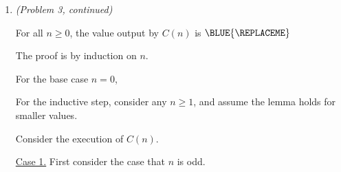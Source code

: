 \begin{enumerate}[label=(\alph*)]
\begin{longFormProof}
    \step By Block~\ref{block: mysterious additions}, for any $n\ge 2$, if the lemma holds for smaller values,
    then it holds for $n$.

    \step By induction (with Step~\ref{step: base additions}), the lemma holds for all $n$.
    
  \end{longFormProof}



  \continued 

\item \emph{(Problem 3, continued)}   %
  
  \begin{lemma}
    For all $n\ge 0$, the value output by $C(n)$ is \(\BLUE{
      \REPLACEME
    }\)
  \end{lemma}
  
  \begin{longFormProof}
    
    \step The proof is by induction on $n$.

    \step\label{step: base}
    For the base case $n=0$, \BLUE{
      \REPLACEME
    }

    \begin{block}\label{block: mysterious}

      \step For the inductive step, consider any $n\ge 1$, and assume the lemma holds for smaller values.

      \step Consider the execution of $C(n)$.

      \begin{blue}
        
      \step \REPLACEME

      \step \REPLACEME


      \end{blue}

      \begin{block}
        \step \underline{Case 1.} First consider the case that $n$ is odd.

        \begin{blue}
          
          \step \REPLACEME

          \step \REPLACEME



\end{blue}
\end{block}
\end{block}
\end{longFormProof}
\end{enumerate}
